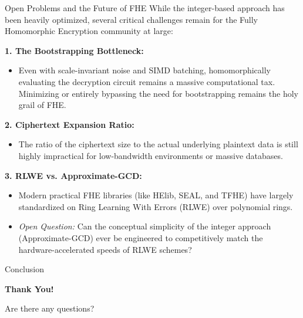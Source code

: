 \documentclass[10pt]{beamer}
\begin{document}
\begin{frame}{Open Problems and the Future of FHE}
    While the integer-based approach has been heavily optimized, several critical challenges remain for the Fully Homomorphic Encryption community at large:
    \pause

    \vspace{0.3cm}
    \textbf{1. The Bootstrapping Bottleneck:}
    \begin{itemize}
        \item Even with scale-invariant noise and SIMD batching, homomorphically evaluating the decryption circuit remains a massive computational tax. Minimizing or entirely bypassing the need for bootstrapping remains the holy grail of FHE.
    \end{itemize}
    \pause

    \vspace{0.2cm}
    \textbf{2. Ciphertext Expansion Ratio:}
    \begin{itemize}
        \item The ratio of the ciphertext size to the actual underlying plaintext data is still highly impractical for low-bandwidth environments or massive databases.
    \end{itemize}
    \pause

    \vspace{0.2cm}
    \textbf{3. RLWE vs. Approximate-GCD:}
    \begin{itemize}
        \item Modern practical FHE libraries (like HElib, SEAL, and TFHE) have largely standardized on Ring Learning With Errors (RLWE) over polynomial rings. 
        \item \textit{Open Question:} Can the conceptual simplicity of the integer approach (Approximate-GCD) ever be engineered to competitively match the hardware-accelerated speeds of RLWE schemes?
    \end{itemize}
\end{frame}

\begin{frame}{Conclusion}
    \begin{center}
        \Large \textbf{Thank You!}
        
        \vspace{0.5cm}
        \normalsize
        Are there any questions?
    \end{center}
\end{frame}
\end{document}
